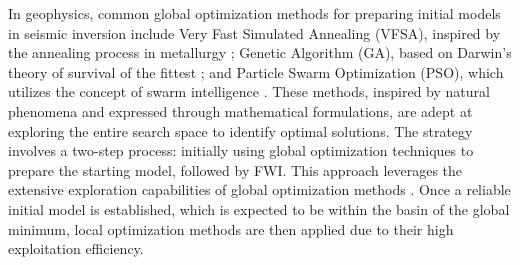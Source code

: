 \documentclass[paper,revised]{geophysics}
\begin{document}
In geophysics, common global optimization methods for preparing initial models in seismic inversion include Very Fast Simulated Annealing (VFSA), inspired by the annealing process in metallurgy \citep{Ingber1989, Kirkpatrick1983, Sacks1989}; Genetic Algorithm (GA), based on Darwin's theory of survival of the fittest \citep{Katoch2021, Michalewicz1996}; and Particle Swarm Optimization (PSO), which utilizes the concept of swarm intelligence \citep{Couceiro2016, Kennedy, Shi1999, Wang2018}. These methods, inspired by natural phenomena and expressed through mathematical formulations, are adept at exploring the entire search space to identify optimal solutions. The strategy involves a two-step process: initially using global optimization techniques to prepare the starting model, followed by FWI. This approach leverages the extensive exploration capabilities of global optimization methods \citep{Dong2015, Ye2024}. Once a reliable initial model is established, which is expected to be within the basin of the global minimum, local optimization methods are then applied due to their high exploitation efficiency.
\end{document}
